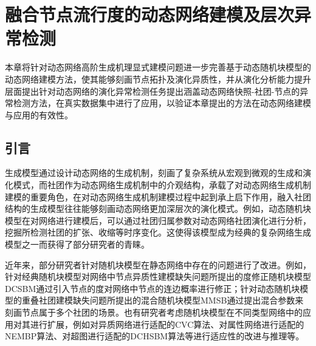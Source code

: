 \baselineskip 20pt
\chapter{融合节点流行度的动态网络建模及层次异常检测}
\label{chap:5}

本章将针对动态网络高阶生成机理显式建模问题进一步完善基于动态随机块模型的动态网络建模方法，使其能够刻画节点拓扑及演化异质性，并从演化分析能力提升层面提出针对动态网络的演化异常检测任务提出涵盖动态网络快照-社团-节点的异常检测方法，在真实数据集中进行了应用，以验证本章提出的方法在动态网络建模与应用的有效性。



\section{引言\label{chap5:intro}}

生成模型通过设计动态网络的生成机制，刻画了复杂系统从宏观到微观的生成和演化模式，而社团作为动态网络生成机制中的介观结构，承载了对动态网络生成机制建模的重要角色\cite{ghoshal2021influence}，在对动态网络生成机制建模过程中起到承上启下作用，融入社团结构的生成模型往往能够刻画动态网络更加深层次的演化模式。例如，动态随机块模型在对网络进行建模后，可以通过社团归属参数对动态网络社团演化进行分析，挖掘所检测社团的扩张、收缩等时序变化\cite{yang2011detecting}。这使得该模型成为经典的复杂网络生成模型之一而获得了部分研究者的青睐。

近年来，部分研究者针对随机块模型在静态网络中存在的问题进行了改进。例如，针对经典随机块模型对网络中节点异质性建模缺失问题所提出的度修正随机块模型DCSBM\cite{ma2021determining}通过引入节点的度对网络中节点的连边概率进行修正；针对动态随机块模型的重叠社团建模缺失问题所提出的混合随机块模型MMSB\cite{godoy2016accurate}通过提出混合参数来刻画节点属于多个社团的场景。也有研究者考虑随机块模型在不同类型网络中的应用对其进行扩展，例如对异质网络进行适配的CVC算法\cite{qin2022consistent}、对属性网络进行适配的NEMBP算法\cite{he2017joint}、对超图进行适配的DCHSBM算法\cite{10214123}等进行适应性的改进与推理等。

